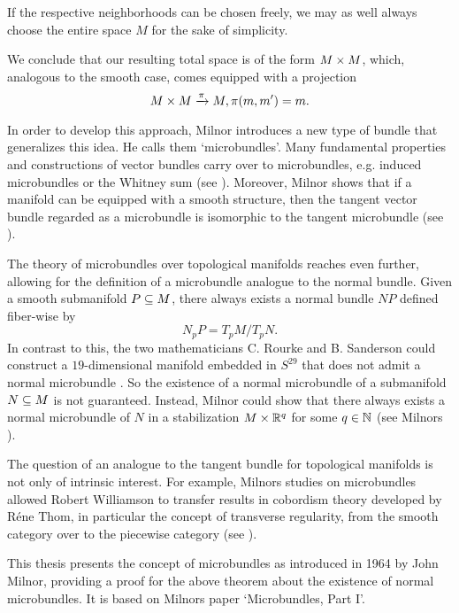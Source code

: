 \begin{myparagraph}
If the respective neighborhoods can be chosen freely, we may as well always choose the entire space $M$ for the sake of simplicity.

We conclude that our resulting total space is of the form $M \times M$, which, analogous to the smooth case, comes equipped with a projection \[ M \times M \xrightarrow{\pi} M, \pi(m, m') = m. \]

In order to develop this approach, Milnor introduces a new type of bundle that generalizes this idea. He calls them `microbundles'. Many fundamental properties and constructions of vector bundles carry over to microbundles, e.g. induced microbundles or the Whitney sum (see ). Moreover, Milnor shows that if a manifold can be equipped with a smooth structure, then the tangent vector bundle regarded as a microbundle is isomorphic to the tangent microbundle (see ).

The theory of microbundles over topological manifolds reaches even further, allowing for the definition of a microbundle analogue to the normal bundle. Given a smooth submanifold $P \subseteq{} M$, there always exists a normal bundle $NP$ defined fiber-wise by \[ N_p P = T_p M / T_p N. \] In contrast to this, the two mathematicians C. Rourke and B. Sanderson could construct a $19$-dimensional manifold embedded in $S^{29}$ that does not admit a normal microbundle \cite{rourke}. So the existence of a normal microbundle of a submanifold $N \subseteq{} M$ is not guaranteed. Instead, Milnor could show that there always exists a normal microbundle of $N$ in a stabilization $M \times \mathbb{R}^q$ for some $q \in \mathbb{N}$ (see Milnors ).

The question of an analogue to the tangent bundle for topological manifolds is not only of intrinsic interest. For example, Milnors studies on microbundles allowed Robert Williamson to transfer results in cobordism theory developed by Réne Thom, in particular the concept of transverse regularity, from the smooth category over to the piecewise category (see \cite[§3]{williamson}).

This thesis presents the concept of microbundles as introduced in 1964 by John Milnor, providing a proof for the above theorem about the existence of normal microbundles. It is based on Milnors paper `Microbundles, Part I'. \end{myparagraph}